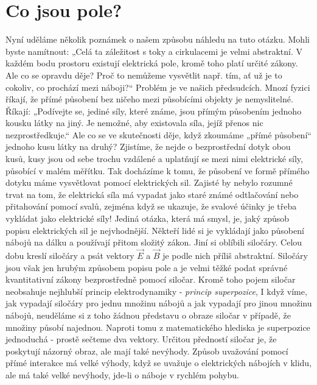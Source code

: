   \section{Co jsou pole?}  
    Nyní uděláme několik poznámek o našem způsobu náhledu na tuto otázku. Mohli byste namítnout: 
    „Celá ta záležitost s toky a cirkulacemi je velmi abstraktní. V každém bodu prostoru existují 
    elektrická pole, kromě toho platí určité zákony. Ale co se opravdu děje? Proč to nemůžeme 
    vysvětlit např. tím, ať už je to cokoliv, co prochází mezi náboji?“ Problém je ve našich 
    předsudcích. Mnozí fyzici říkají, že přímé působení bez ničeho mezi působícími objekty je 
    nemyslitelné. Říkají: „Podívejte se, jediné síly, které známe, jsou přímým působením jednoho 
    kousku látky na jiný. Je nemožné, aby existovala síla, jejíž přenos nic nezprostředkuje.“ Ale 
    co se ve skutečnosti děje, když zkoumáme „přímé působení“ jednoho kusu látky na druhý? 
    Zjistíme, že nejde o bezprostřední dotyk obou kusů, kusy jsou od sebe trochu vzdálené a 
    uplatňují se mezi nimi elektrické síly, působící v malém měřítku. Tak docházíme k tomu, že 
    působení ve formě přímého dotyku máme vysvětlovat pomocí elektrických sil. Zajisté by nebylo 
    rozumné trvat na tom, že elektrická síla má vypadat jako staré známé odtlačování nebo 
    přitahování pomocí svalů, zejména když se ukazuje, že svalové účinky je třeba vykládat jako 
    elektrické síly! Jediná otázka, která má smysl, je, jaký způsob popisu elektrických sil je 
    nejvhodnější. Někteří lidé si je vykládají jako působení nábojů na dálku a používají přitom 
    složitý zákon. Jiní si oblíbili siločáry. Celou dobu kreslí siločáry a psát vektory \(\vec{E}\) 
    a \(\vec{B}\) je podle nich příliš abstraktní. Siločáry jsou však jen hrubým způsobem popisu 
    pole a je velmi těžké podat správné kvantitativní zákony bezprostředně pomocí siločar. Kromě 
    toho pojem siločar neobsahuje nejhlubší princip elektrodynamiky - \emph{princip superpozice}, I 
    když víme, jak vypadají siločáry pro jednu množinu nábojů a jak vypadají pro jinou množinu 
    nábojů, neuděláme si z toho žádnou představu o obraze siločar v případě, že množiny působí 
    najednou. Naproti tomu z matematického hlediska je superpozice jednoduchá - prostě sečteme dva 
    vektory. Určitou předností siločar je, že poskytují názorný obraz, ale mají také nevýhody. 
    Způsob uvažování pomocí přímé interakce má velké výhody, když se uvažuje o elektrických 
    nábojích v klidu, ale má také velké nevýhody, jde-li o náboje v rychlém pohybu.
    
